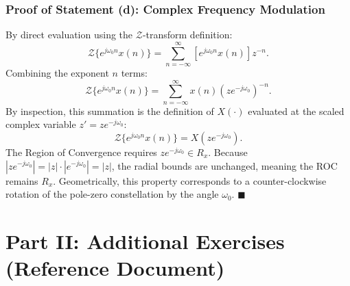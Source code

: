 \documentclass[12pt,a4paper]{article}
\begin{document}
\subsubsection{Proof of Statement (d): Complex Frequency Modulation}
By direct evaluation using the $\mathcal{Z}$-transform definition:
\begin{equation}
    \mathcal{Z}\{e^{j\omega_0 n} x(n)\} = \sum_{n=-\infty}^{\infty} \left[ e^{j\omega_0 n} x(n) \right] z^{-n}.
\end{equation}
Combining the exponent $n$ terms:
\begin{equation}
    \mathcal{Z}\{e^{j\omega_0 n} x(n)\} = \sum_{n=-\infty}^{\infty} x(n) \left( z e^{-j\omega_0} \right)^{-n}.
\end{equation}
By inspection, this summation is the definition of $X(\cdot)$ evaluated at the scaled complex variable $z' = z e^{-j\omega_0}$:
\begin{equation}
    \mathcal{Z}\{e^{j\omega_0 n} x(n)\} = X\left( z e^{-j\omega_0} \right).
\end{equation}
The Region of Convergence requires $z e^{-j\omega_0} \in R_x$. Because $|z e^{-j\omega_0}| = |z| \cdot |e^{-j\omega_0}| = |z|$, the radial bounds are unchanged, meaning the ROC remains $R_x$. Geometrically, this property corresponds to a counter-clockwise rotation of the pole-zero constellation by the angle $\omega_0$. \hfill $\blacksquare$

\newpage

\section{Part II: Additional Exercises (Reference Document)}

\end{document}
